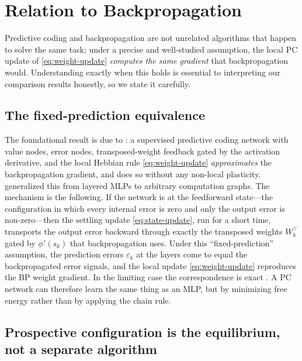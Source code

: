 \section{Relation to Backpropagation}

Predictive coding and backpropagation are not unrelated algorithms that happen to solve the same
task; under a precise and well-studied assumption, the local PC update of \cref{eq:weight-update}
\emph{computes the same gradient} that backpropagation would. Understanding exactly when this holds
is essential to interpreting our comparison results honestly, so we state it carefully.

\subsection{The fixed-prediction equivalence}

The foundational result is due to \citet{whittington2017approximation}: a supervised predictive
coding network with value nodes, error nodes, transposed-weight feedback gated by the activation
derivative, and the local Hebbian rule \cref{eq:weight-update} \emph{approximates} the
backpropagation gradient, and does so without any non-local plasticity. \citet{millidge2022backprop}
generalized this from layered MLPs to arbitrary computation graphs. The mechanism is the
following. If the network is at the feedforward state---the configuration in which every internal
error is zero and only the output error is non-zero---then the settling update
\cref{eq:state-update}, run for a short time, transports the output error backward through exactly
the transposed weights $W_k^\top$ gated by $\phi'(s_k)$ that backpropagation uses. Under this
``fixed-prediction'' assumption, the prediction errors $\varepsilon_k$ at the layers come to equal
the backpropagated error signals, and the local update \cref{eq:weight-update} reproduces the BP
weight gradient. In the limiting case the correspondence is exact \citep{whittington2017approximation}.
A PC network can therefore learn the same thing as an MLP, but by minimizing free energy rather
than by applying the chain rule.

\subsection{Prospective configuration is the equilibrium, not a separate algorithm}

